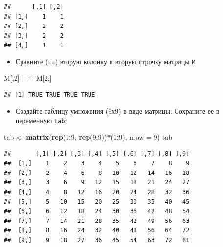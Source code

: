 \documentclass[]{book}
\newenvironment{Shaded}{\begin{snugshade}}{\end{snugshade}}
\newcommand{\KeywordTok}[1]{\textcolor[rgb]{0.13,0.29,0.53}{\textbf{#1}}}
\newcommand{\DataTypeTok}[1]{\textcolor[rgb]{0.13,0.29,0.53}{#1}}
\newcommand{\DecValTok}[1]{\textcolor[rgb]{0.00,0.00,0.81}{#1}}
\newcommand{\StringTok}[1]{\textcolor[rgb]{0.31,0.60,0.02}{#1}}
\newcommand{\OperatorTok}[1]{\textcolor[rgb]{0.81,0.36,0.00}{\textbf{#1}}}
\newcommand{\NormalTok}[1]{#1}
\providecommand{\tightlist}{%
  \setlength{\itemsep}{0pt}\setlength{\parskip}{0pt}}
\begin{document}
\begin{verbatim}
##      [,1] [,2]
## [1,]    1    1
## [2,]    2    2
## [3,]    2    2
## [4,]    1    1
\end{verbatim}

\begin{itemize}
\tightlist
\item
  Сравните (\texttt{==}) вторую колонку и вторую строчку матрицы
  \texttt{M}
\end{itemize}

\begin{Shaded}
\begin{Highlighting}[]
\NormalTok{M[,}\DecValTok{2}\NormalTok{] }\OperatorTok{==}\StringTok{ }\NormalTok{M[}\DecValTok{2}\NormalTok{,]}
\end{Highlighting}
\end{Shaded}

\begin{verbatim}
## [1] TRUE TRUE TRUE TRUE
\end{verbatim}

\begin{itemize}
\tightlist
\item
  Создайте таблицу умножения (9х9) в виде матрицы. Сохраните ее в
  переменную \texttt{tab}:
\end{itemize}

\begin{Shaded}
\begin{Highlighting}[]
\NormalTok{tab <-}\StringTok{ }\KeywordTok{matrix}\NormalTok{(}\KeywordTok{rep}\NormalTok{(}\DecValTok{1}\OperatorTok{:}\DecValTok{9}\NormalTok{, }\KeywordTok{rep}\NormalTok{(}\DecValTok{9}\NormalTok{,}\DecValTok{9}\NormalTok{))}\OperatorTok{*}\NormalTok{(}\DecValTok{1}\OperatorTok{:}\DecValTok{9}\NormalTok{), }\DataTypeTok{nrow =} \DecValTok{9}\NormalTok{)}
\NormalTok{tab}
\end{Highlighting}
\end{Shaded}

\begin{verbatim}
##       [,1] [,2] [,3] [,4] [,5] [,6] [,7] [,8] [,9]
##  [1,]    1    2    3    4    5    6    7    8    9
##  [2,]    2    4    6    8   10   12   14   16   18
##  [3,]    3    6    9   12   15   18   21   24   27
##  [4,]    4    8   12   16   20   24   28   32   36
##  [5,]    5   10   15   20   25   30   35   40   45
##  [6,]    6   12   18   24   30   36   42   48   54
##  [7,]    7   14   21   28   35   42   49   56   63
##  [8,]    8   16   24   32   40   48   56   64   72
##  [9,]    9   18   27   36   45   54   63   72   81
\end{verbatim}
\end{document}
